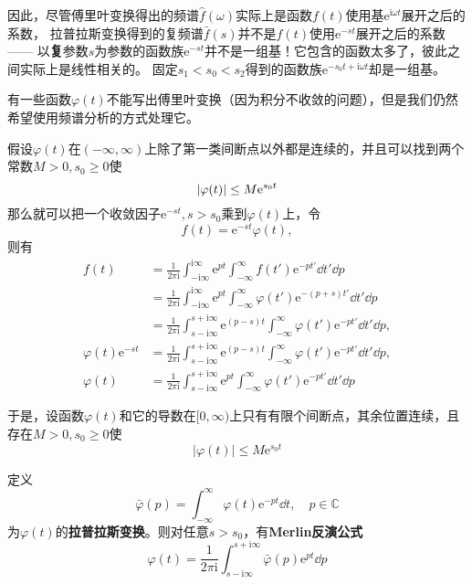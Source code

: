 \documentclass[UTF8]{ctexart}
\newcommand*{\complexes}{\mathbb{C}}
\newcommand*{\ii}{\mathrm{i}}
\newcommand*{\ee}{\mathrm{e}}
\begin{document}
因此，尽管傅里叶变换得出的频谱$\hat{f}(\omega)$实际上是函数$f(t)$使用基$\ee^{\ii \omega t}$展开之后的系数，
拉普拉斯变换得到的复频谱$\bar{f}(s)$并不是$f(t)$使用$\ee^{-st}$展开之后的系数——
以\textbf{复}参数$s$为参数的函数族$\ee^{-st}$并不是一组基！它包含的函数太多了，彼此之间实际上是线性相关的。
固定$s_1 < s_0 < s_2$得到的函数族$\ee^{-s_0 t + \ii \omega t}$却是一组基。

有一些函数$\varphi(t)$不能写出傅里叶变换（因为积分不收敛的问题），但是我们仍然希望使用频谱分析的方式处理它。

假设$\varphi(t)$在$(-\infty, \infty)$上除了第一类间断点以外都是连续的，并且可以找到两个常数$M>0, s_0 \geq 0$使
\[
    \abs{\varphi(t)} \leq M \ee^{s_0 t}
\]
那么就可以把一个收敛因子$\ee^{-st}, s > s_0$乘到$\varphi(t)$上，令
\[
    f(t) = \ee^{-st} \varphi(t),
\]
则有
\[
    \begin{aligned}
        f(t) &= \frac{1}{2\pi \ii} \int_{-\ii \infty}^{\ii \infty} \ee^{pt} \int_{-\infty}^\infty f(t') \ee^{-pt'} \dd t' \dd p \\
        &= \frac{1}{2\pi \ii} \int_{-\ii \infty}^{\ii \infty} \ee^{pt} \int_{-\infty}^\infty \varphi(t') \ee^{-(p+s)t'} \dd t' \dd p \\
        &= \frac{1}{2\pi \ii} \int_{s-\ii \infty}^{s+\ii \infty} \ee^{(p-s)t} \int_{-\infty}^\infty \varphi(t') \ee^{-pt'} \dd t' \dd p, \\
        \varphi(t) \ee^{-st} &= \frac{1}{2\pi \ii} \int_{s-\ii \infty}^{s+\ii \infty} \ee^{(p-s)t} \int_{-\infty}^\infty \varphi(t') \ee^{-pt'} \dd t' \dd p, \\
        \varphi(t) &= \frac{1}{2\pi \ii} \int_{s-\ii \infty}^{s+\ii \infty} \ee^{pt} \int_{-\infty}^\infty \varphi(t') \ee^{-pt'} \dd t' \dd p
    \end{aligned}
\]

于是，设函数$\varphi(t)$和它的导数在$[0, \infty)$上只有有限个间断点，其余位置连续，且存在$M>0, s_0 \geq 0$使
\[
    |\varphi(t)| \leq M \ee^{s_0 t}
\]

定义
\begin{equation}
    \bar{\varphi}(p) = \int_{-\infty}^\infty \varphi(t) \ee^{-pt} \dd t, \quad p \in \complexes
\end{equation}
为$\varphi(t)$的\textbf{拉普拉斯变换}。则对任意$s>s_0$，有\textbf{Merlin反演公式}
\begin{equation}
    \varphi(t) = \frac{1}{2\pi \ii} \int_{s-\ii \infty}^{s+\ii \infty} \bar{\varphi}(p) \ee^{pt} \dd p
\end{equation}
\end{document}
